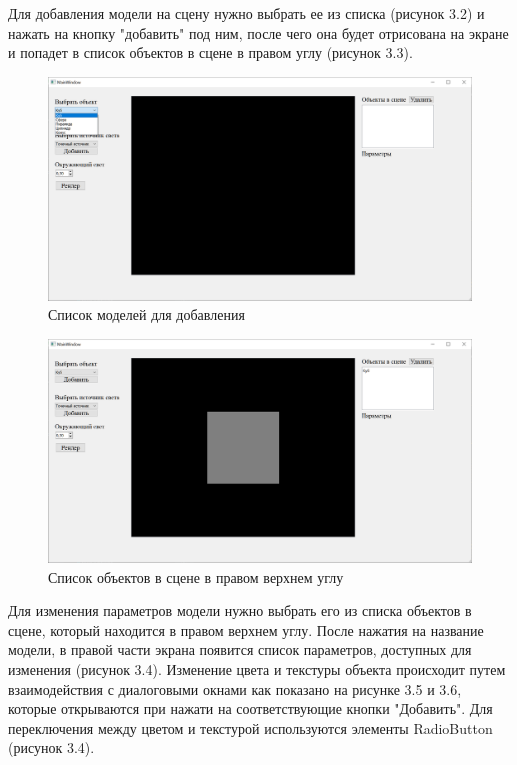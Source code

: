 \documentclass[12pt,a4paper,oneside]{report}
\begin{document}
	Для добавления модели на сцену нужно выбрать ее из списка (рисунок 3.2) и нажать на кнопку "добавить" под ним, после чего она будет отрисована на экране и попадет в список объектов в сцене в правом углу (рисунок 3.3). 
	
	 \begin{figure}[H]
		\centering
		\includegraphics[scale = 0.5]{list}
		\caption{Список моделей для добавления}
	\end{figure}
	
	\begin{figure}[H]
		\centering
		\includegraphics[scale = 0.5]{list_object}
		\caption{Список объектов в сцене в правом верхнем углу}
	\end{figure}

	Для изменения параметров модели нужно выбрать его из списка объектов в сцене, который находится в правом верхнем углу. После нажатия на название модели, в правой части экрана появится список параметров, доступных для изменения (рисунок 3.4). Изменение цвета и текстуры объекта происходит путем взаимодействия с диалоговыми окнами как показано на рисунке 3.5 и 3.6, которые открываются при нажати на соответствующие кнопки "Добавить". Для переключения между цветом и текстурой используются элементы RadioButton (рисунок 3.4).
	
\end{document}
